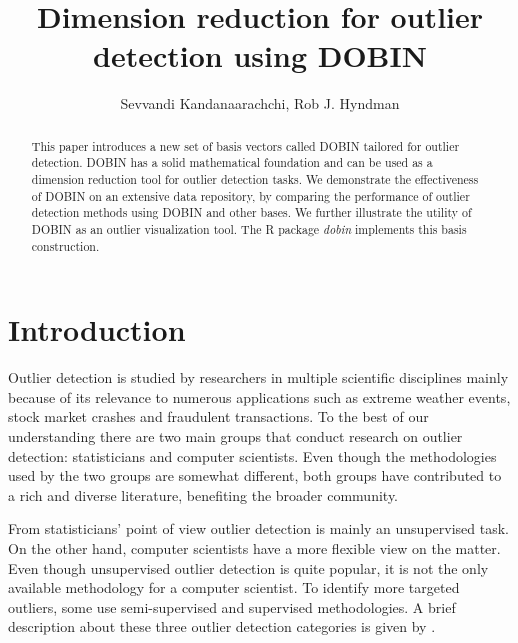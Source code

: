 \documentclass[a4paper,11pt]{article}
\begin{document}

\title{Dimension reduction for outlier detection using DOBIN}
\author{Sevvandi Kandanaarachchi, Rob J. Hyndman}
\maketitle

\begin{abstract}
This paper introduces a new set of basis vectors called DOBIN tailored for outlier detection. DOBIN has a solid mathematical foundation and can be used as a dimension reduction tool for outlier detection tasks.  We demonstrate the effectiveness of DOBIN on an extensive data repository, by comparing the performance of outlier detection methods using DOBIN and other bases.  We further illustrate the utility of DOBIN as an outlier visualization tool.  The R package \textit{dobin} implements this basis construction.
\end{abstract}


\section{Introduction}

Outlier detection is studied by researchers in multiple scientific disciplines mainly because of its relevance to numerous applications such as extreme weather events, stock market crashes and fraudulent transactions. To the best of our understanding there are two main groups that conduct research on outlier detection:  statisticians and computer scientists. Even though the methodologies used by the two groups are somewhat different, both groups have contributed to a rich and diverse literature, benefiting the broader community.

From statisticians' point of view outlier detection is mainly an unsupervised task. On the other hand, computer scientists have a more flexible view on the matter. Even though unsupervised outlier detection is quite popular, it is not the only  available methodology for a computer scientist.  To identify more targeted outliers, some use  semi-supervised and supervised methodologies. A brief description about these three outlier detection categories is given by \cite{goldstein2016comparative}.
\end{document}
